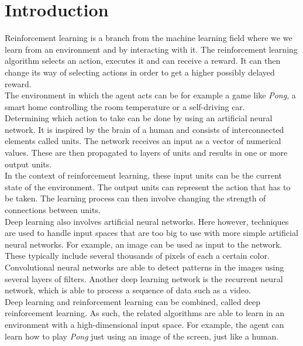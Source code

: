 \chapter{Introduction}

Reinforcement learning is a branch from the machine learning field where we we learn from an environment and by interacting with it. The reinforcement learning algorithm selects an action, executes it and can receive a reward. It can then change its way of selecting actions in order to get a higher possibly delayed reward.\\
The environment in which the agent acts can be for example a game like \textit{Pong}, a smart home controlling the room temperature or a self-driving car.\\

Determining which action to take can be done by using an artificial neural network. It is inspired by the brain of a human and consists of interconnected elements called units. The network receives an input as a vector of numerical values. These are then propagated to layers of units and results in one or more output units.\\
In the context of reinforcement learning, these input units can be the current state of the environment. The output units can represent the action that has to be taken. The learning process can then involve changing the strength of connections between units.\\

Deep learning also involves artificial neural networks. Here however, techniques are used to handle input spaces that are too big to use with more simple artificial neural networks. For example, an image can be used as input to the network. These typically include several thousands of pixels of each a certain color. Convolutional neural networks are able to detect patterns in the images using several layers of filters. Another deep learning network is the recurrent neural network, which is able to process a sequence of data such as a video.\\

Deep learning and reinforcement learning can be combined, called deep reinforcement learning. As such, the related algorithms are able to learn in an environment with a high-dimensional input space. For example, the agent can learn how to play \textit{Pong} just using an image of the screen, just like a human.\\

